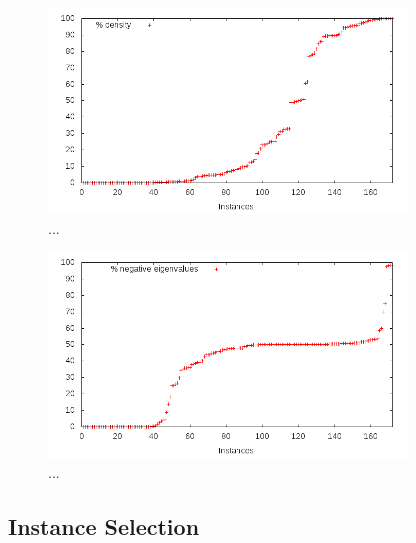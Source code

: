 \begin{figure}\centering
  \includegraphics[width=0.85\textwidth]{pic_density.png}
  \caption{...\label{fig:10}}
\end{figure}

\begin{figure}\centering
  \includegraphics[width=0.85\textwidth]{pic_neg_eig.png}
  \caption{...\label{fig:10}}
\end{figure}









\subsection{Instance Selection}\label{subsec:selection}










